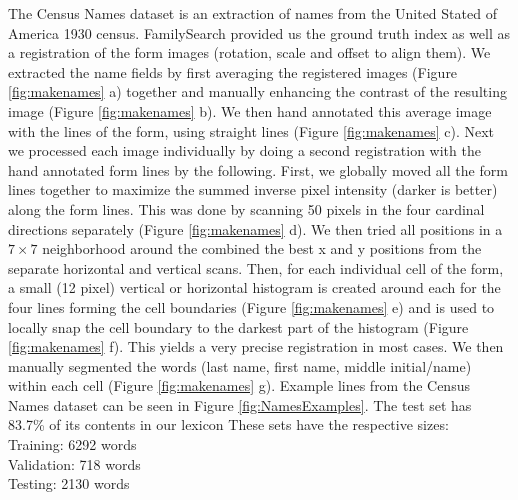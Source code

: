 \documentclass[ms,electronic,twosidetoc,letterpaper,chaptercenter,parttop,lol,lof,lot]{byumsphd}
\begin{document}
The Census Names dataset is an extraction of names from the United Stated of America 1930 census. FamilySearch provided us the ground truth index as well as a  registration of the form images (rotation, scale and offset to align them). We extracted the name fields by first averaging the registered images (Figure \ref{fig:makenames} a) together and manually enhancing the contrast of the resulting image (Figure \ref{fig:makenames} b). We then hand annotated this average image with the lines of the form, using straight lines (Figure \ref{fig:makenames} c). Next we processed each image individually by doing a second registration with the hand annotated form lines by the following. First, we globally moved all the form lines together to maximize the summed inverse pixel intensity (darker is better) along the form lines. This was done by scanning 50 pixels in the four cardinal directions separately (Figure \ref{fig:makenames} d). We then tried all positions in a $7\times 7$ neighborhood around the combined the best x and y positions from the separate horizontal and vertical scans. %
 Then, for each individual cell of the form, a small (12 pixel) vertical or horizontal histogram is created around each for the four lines forming the cell boundaries (Figure \ref{fig:makenames} e) and is used to locally snap the cell boundary to the darkest part of the histogram (Figure \ref{fig:makenames} f). This yields a very precise registration in most cases. We then manually segmented the words (last name, first name, middle initial/name) within each cell (Figure \ref{fig:makenames} g). 
Example lines from the Census Names dataset can be seen in Figure \ref{fig:NamesExamples}.
The test set has 83.7\% of its contents in our lexicon
These sets have the respective sizes:\\
\indent \indent Training: 6292 words\\
\indent \indent Validation: 718 words\\
\indent \indent Testing: 2130 words
\end{document}
